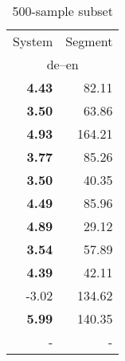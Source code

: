 \begin{table}[ht]
\begin{subtable}{0.19\linewidth}
{\begin{tabular}{rr}
\toprule
System & Segment \\
\multicolumn{2}{c}{de--en} \\
\midrule
\textbf{4.43}   &  {82.11}  \\
\textbf{3.50}   &  {63.86}  \\
\textbf{4.93}   &  {164.21}  \\
\midrule
\textbf{3.77}   &  {85.26}  \\
\textbf{3.50}   &  {40.35}  \\
\midrule
\textbf{4.49}   &  {85.96}  \\
\textbf{4.89}   &  {29.12}  \\
\midrule
\textbf{3.54}   &  {57.89}  \\
\textbf{4.39}   &  {42.11}  \\
\midrule
-3.02 & 134.62 \\
\midrule
\textbf{5.99}   &  {140.35}  \\
 - & - \\
\bottomrule
\end{tabular}}
\caption{\label{tab:correl-500-subset}500-sample subset}
\end{subtable}
\end{table}
